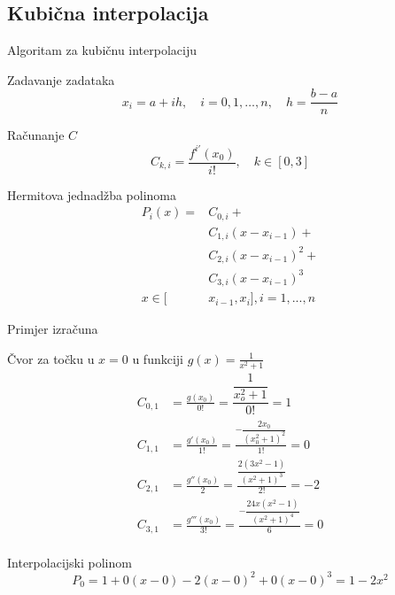 \documentclass[10pt]{beamer}
\begin{document}
\subsection{Kubična interpolacija}
\begin{frame}{Algoritam za kubičnu interpolaciju}

	\begin{exampleblock}{Zadavanje zadataka}
		\begin{equation*}
		x_i=a+ih,\quad i=0,1,\ldots,n,\quad h=\frac{b-a}{n}
		\end{equation*}
	\end{exampleblock}
	\begin{exampleblock}{Računanje $C$}
		\begin{equation*}
		C_{k, i}=\frac{f^{i'}(x_0)}{i!},\quad k\in [0, 3]
		\end{equation*}
		
	\end{exampleblock}
	
	\begin{exampleblock}{Hermitova jednadžba polinoma}
	\begin{align*}
	P_i(x)=&C_{0,i}+\\&C_{1,i}(x-x_{i-1})+\\&C_{2,i}(x-x_{i-1})^2+\\&C_{3,i}(x-x_{i-1})^3 \\
	x\in[&x_{i-1}, x_i], i=1,...,n
	\end{align*}	
	\end{exampleblock}
	
\end{frame}
\begin{frame}{Primjer izračuna}
\begin{exampleblock}{Čvor za točku u $x=0$ u funkciji $g(x)=\frac{1}{x^2+1}$}
	\begin{align*}
	C_{0,1}&=\frac{g(x_0)}{0!}=\dfrac{\dfrac{1}{x_o^2+1}}{0!}= 1\\
	C_{1,1}&=\frac{g'(x_0)}{1!}=\frac{-\dfrac{2x_0}{(x_0^2+1)^2}}{1!}=0\\
	C_{2,1}&=\frac{g''(x_0)}{2}=\frac{\dfrac{2(3x^2-1)}{(x^2+1)^3}
	}{2!}=-2\\
	C_{3,1}&=\frac{g'''(x_0)}{3!}=\frac{-\dfrac{24x\left(x^2-1\right)}{\left(x^2+1\right)^4}}{6}=0\\
	\end{align*}
\end{exampleblock}
\begin{exampleblock}{Interpolacijski polinom}
	\begin{equation*}
	P_0=1+0(x-0)-2(x-0)^2+0(x-0)^3 = 1-2x^2
	\end{equation*}
\end{exampleblock}
\end{frame}
\end{document}
